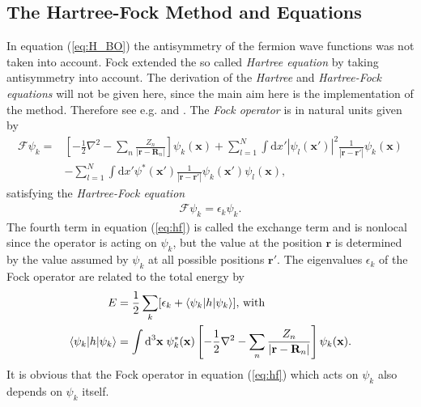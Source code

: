 \documentclass[10pt,a4paper]{article} %
\begin{document}
    \subsection{The Hartree-Fock Method and Equations}
 In equation (\ref{eq:H_BO}) the antisymmetry of the fermion wave functions was not taken into account. Fock extended the so called \textit{Hartree equation} by taking antisymmetry into account. The derivation of the \textit{Hartree} and \textit{Hartree-Fock equations} will not be given here, since the main aim here is the implementation of the method. Therefore see e.g. \cite[p. 56-60]{Thijssen2007} and \cite[chapter 3]{Jensen2013}. The \textit{Fock operator} is in natural units given by
 \begin{align} \label{eq:hf}
 \mathcal{F}\psi_k = &\left[-\frac{1}{2} \nabla^2 
 - \sum_n \frac{Z_n}{|\mathbf{r}- \mathbf{R}_n|}\right]\psi_k(\mathbf{x}) + \nonumber
 \sum_{l=1}^N \int \text{d}x' |\psi_l(\mathbf{x}')|^2 \frac{1}{|\mathbf{r}-\mathbf{r}'|} \psi_k(\mathbf{x}) \\
&- \sum_{l=1}^N \int \text{d}x' \psi^*(\mathbf{x}')\frac{1}{|\mathbf{r}-\mathbf{r}'|} \psi_k(\mathbf{x}')\psi_l(\mathbf{x})\text{,}
 \end{align}
 satisfying the \textit{Hartree-Fock equation}
 \begin{align*}
 \mathcal{F} \psi_k = \epsilon_k \psi_k \text{.}
 \end{align*} The fourth term in equation (\ref{eq:hf}) is called the exchange term \cite[p. 55]{Thijssen2007} and is nonlocal since the operator is acting on $\psi_k$, but the value at the position $\mathbf{r}$ is determined by the value assumed by $\psi_k$ at all possible positions $\mathbf{r}'$. The eigenvalues $\epsilon_k$ of the Fock operator are related to the total energy by
 \begin{align*}
 E &= \frac{1}{2} \sum_k [\epsilon_k + \braket{\psi_k|h|\psi_k}] \text{, with}\\
 \braket{\psi_k|h|\psi_k} &= \int \text{d}^3\mathbf{x}\; \psi_k^*(\mathbf{x}) \left[-\frac{1}{2} \nabla^2 
 - \sum_n \frac{Z_n}{|\mathbf{r}- \mathbf{R}_n|}\right] \psi_k(\mathbf{x}) \text{.}
 \end{align*} It is obvious that the Fock operator in equation (\ref{eq:hf}) which acts on $\psi_k$ also depends on $\psi_k$ itself.
    
    
    
    
\end{document}

